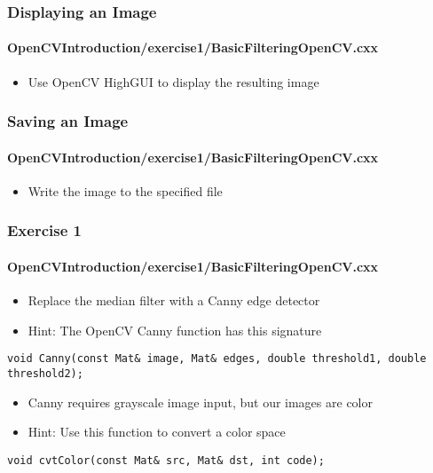 \begin{frame}
\frametitle{Displaying an Image}
\framesubtitle{OpenCVIntroduction/exercise1/BasicFilteringOpenCV.cxx}
\begin{center}
\begin{itemize}
\item Use OpenCV HighGUI to display the resulting image
\end{itemize}

\end{center}
\end{frame}


\begin{frame}
\frametitle{Saving an Image}
\framesubtitle{OpenCVIntroduction/exercise1/BasicFilteringOpenCV.cxx}
\begin{center}
\begin{itemize}
\item Write the image to the specified file
\end{itemize}

\end{center}
\end{frame}


\begin{frame}[fragile]
\frametitle{Exercise 1}
\framesubtitle{OpenCVIntroduction/exercise1/BasicFilteringOpenCV.cxx}
\begin{center}
\begin{itemize}
\item Replace the median filter with a Canny edge detector
\end{itemize}

\begin{itemize}
\item Hint: The OpenCV Canny function has this signature
\end{itemize}
\begin{lstlisting}
void Canny(const Mat& image, Mat& edges, double threshold1, double threshold2);
\end{lstlisting}
\begin{itemize}
\item Canny requires grayscale image input, but our images are color
\item Hint: Use this function to convert a color space
\end{itemize}
\begin{lstlisting}
void cvtColor(const Mat& src, Mat& dst, int code);
\end{lstlisting}
\end{center}
\end{frame}
